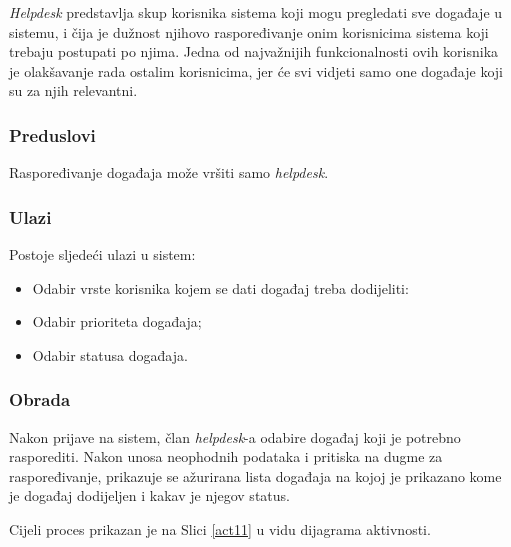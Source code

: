 \documentclass[12pt,a4paper]{article}
\begin{document}
\textit{Helpdesk} predstavlja skup korisnika sistema koji mogu pregledati sve događaje u sistemu, i čija je dužnost njihovo raspoređivanje onim korisnicima sistema koji trebaju postupati po njima. Jedna od najvažnijih funkcionalnosti ovih korisnika je olakšavanje rada ostalim korisnicima, jer će svi vidjeti samo one događaje koji su za njih relevantni.

\subsubsection{Preduslovi}

Raspoređivanje događaja može vršiti samo \textit{helpdesk}.

\subsubsection{Ulazi}

Postoje sljedeći ulazi u sistem:

\begin{itemize}
\item Odabir vrste korisnika kojem se dati događaj treba dodijeliti:
\item Odabir prioriteta događaja;
\item Odabir statusa događaja.
\end{itemize}

\subsubsection{Obrada}

Nakon prijave na sistem, član \textit{helpdesk}-a odabire događaj koji je potrebno rasporediti. Nakon unosa neophodnih podataka i pritiska na dugme za raspoređivanje, prikazuje se ažurirana lista događaja na kojoj je prikazano kome je događaj dodijeljen i kakav je njegov status.

Cijeli proces prikazan je na Slici \ref{act11} u vidu dijagrama aktivnosti.
\end{document}
